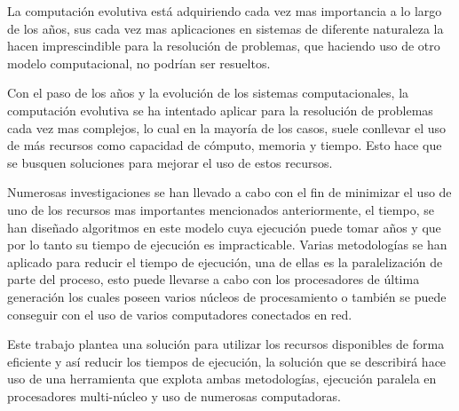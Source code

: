 La computaci\'on evolutiva est\'a adquiriendo cada vez mas importancia a lo largo de los a\~nos, sus cada vez mas aplicaciones en sistemas de diferente naturaleza la hacen imprescindible para la resoluci\'on de problemas, que haciendo uso de otro modelo computacional, no podr\'ian ser resueltos.

Con el paso de los a\~nos y la evoluci\'on de los sistemas computacionales, la computaci\'on evolutiva se ha intentado aplicar para la resoluci\'on de problemas cada vez mas complejos, lo cual en la mayor\'ia de los casos, suele conllevar el uso de m\'as recursos como capacidad de c\'omputo, memoria y tiempo. Esto hace que se busquen soluciones para mejorar el uso de estos recursos.

Numerosas investigaciones se han llevado a cabo con el fin de minimizar el uso de uno de los recursos mas importantes mencionados anteriormente, el tiempo, se han dise\~nado algoritmos en este modelo cuya ejecuci\'on puede tomar a\~nos y que por lo tanto su tiempo de ejecuci\'on es impracticable. Varias metodolog\'ias se han aplicado para reducir el tiempo de ejecuci\'on, una de ellas es la paralelizaci\'on de parte del proceso, esto puede llevarse a cabo con los procesadores de \'ultima generaci\'on los cuales poseen varios n\'ucleos de procesamiento o tambi\'en se puede conseguir con el uso de varios computadores conectados en red.

Este trabajo plantea una soluci\'on para utilizar los recursos disponibles de forma eficiente y as\'i reducir los tiempos de ejecuci\'on, la soluci\'on que se describir\'a hace uso de una herramienta que explota ambas metodolog\'ias, ejecuci\'on paralela en procesadores multi-n\'ucleo y uso de numerosas computadoras.